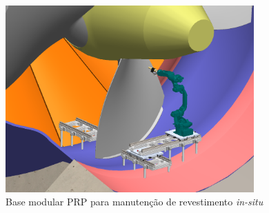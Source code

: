 \begin{figure}[h]
	\centering 
 	\includegraphics[width=0.85\textwidth]{figs/prp_turbina}
 	\caption{Base modular PRP para manutenção de revestimento \textit{in-situ}}
 	\label{fig::prp_turbina}
\end{figure}




















